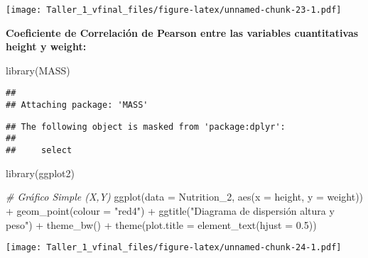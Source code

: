 \documentclass[
]{article}
\newenvironment{Shaded}{\begin{snugshade}}{\end{snugshade}}
\newcommand{\AttributeTok}[1]{\textcolor[rgb]{0.77,0.63,0.00}{#1}}
\newcommand{\CommentTok}[1]{\textcolor[rgb]{0.56,0.35,0.01}{\textit{#1}}}
\newcommand{\FloatTok}[1]{\textcolor[rgb]{0.00,0.00,0.81}{#1}}
\newcommand{\FunctionTok}[1]{\textcolor[rgb]{0.00,0.00,0.00}{#1}}
\newcommand{\NormalTok}[1]{#1}
\newcommand{\SpecialCharTok}[1]{\textcolor[rgb]{0.00,0.00,0.00}{#1}}
\newcommand{\StringTok}[1]{\textcolor[rgb]{0.31,0.60,0.02}{#1}}
\begin{document}
\texttt{[image: Taller\_1\_vfinal\_files/figure-latex/unnamed-chunk-23-1.pdf]}

\textbf{Coeficiente de Correlación de Pearson entre las variables
cuantitativas height y weight:}

\begin{Shaded}
\begin{Highlighting}[]
\FunctionTok{library}\NormalTok{(MASS)}
\end{Highlighting}
\end{Shaded}

\begin{verbatim}
## 
## Attaching package: 'MASS'
\end{verbatim}

\begin{verbatim}
## The following object is masked from 'package:dplyr':
## 
##     select
\end{verbatim}

\begin{Shaded}
\begin{Highlighting}[]
\FunctionTok{library}\NormalTok{(ggplot2)}


\CommentTok{\# Gráfico Simple (X,Y)}
\FunctionTok{ggplot}\NormalTok{(}\AttributeTok{data =}\NormalTok{ Nutrition\_2, }\FunctionTok{aes}\NormalTok{(}\AttributeTok{x =}\NormalTok{ height, }\AttributeTok{y =}\NormalTok{ weight)) }\SpecialCharTok{+} 
  \FunctionTok{geom\_point}\NormalTok{(}\AttributeTok{colour =} \StringTok{"red4"}\NormalTok{) }\SpecialCharTok{+}
  \FunctionTok{ggtitle}\NormalTok{(}\StringTok{"Diagrama de dispersión altura y peso"}\NormalTok{) }\SpecialCharTok{+}
  \FunctionTok{theme\_bw}\NormalTok{() }\SpecialCharTok{+}
  \FunctionTok{theme}\NormalTok{(}\AttributeTok{plot.title =} \FunctionTok{element\_text}\NormalTok{(}\AttributeTok{hjust =} \FloatTok{0.5}\NormalTok{))}
\end{Highlighting}
\end{Shaded}

\texttt{[image: Taller\_1\_vfinal\_files/figure-latex/unnamed-chunk-24-1.pdf]}

\begin{Shaded}
\end{Shaded}
\end{document}
